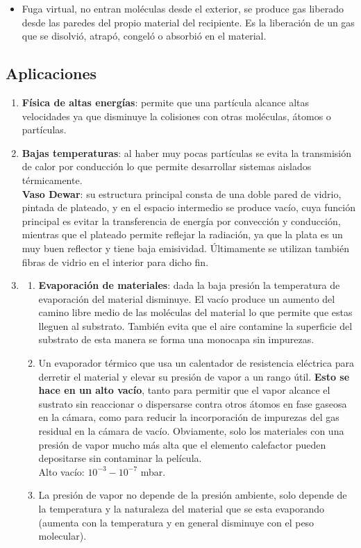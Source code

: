 \begin{enumerate}[resume]
\begin{itemize}
        \item Fuga virtual, no entran moléculas desde el exterior, se produce gas liberado desde las paredes del propio material del recipiente. Es la liberación de un gas que se disolvió, atrapó, congeló o absorbió en el material.
        
    \end{itemize}
\end{enumerate}

\subsection{Aplicaciones}
\begin{enumerate}[resume]
    \item %
    \textbf{Física de altas energías}: permite que una partícula alcance altas velocidades ya que disminuye la colisiones con otras moléculas, átomos o partículas.
    \item %
    \textbf{Bajas temperaturas}:  al haber muy pocas partículas se evita la transmisión de calor por conducción lo que permite desarrollar sistemas aislados térmicamente.
    \\ 
    \textbf{Vaso Dewar}: su estructura principal consta de una doble pared de vidrio, pintada de plateado, y en el espacio intermedio se produce vacío, cuya función principal es evitar la transferencia de energía por convección y conducción, mientras que el plateado permite reflejar la radiación, ya que la plata es un muy buen reflector y tiene baja emisividad. Últimamente se utilizan también fibras de vidrio en el interior para dicho fin.
    \item %
    \begin{enumerate}
        \item %
        \textbf{Evaporación de materiales}:  dada la baja presión la temperatura de evaporación del material disminuye. El vacío produce un aumento del camino libre medio de las moléculas del material lo que permite que estas lleguen al substrato. También evita que el aire contamine la superficie del substrato de esta manera se forma una monocapa sin impurezas. 
        \item %
        Un evaporador térmico que usa un calentador de resistencia eléctrica para derretir el material y elevar su presión de vapor a un rango útil. \textbf{Esto se hace en un alto vacío}, tanto para permitir que el vapor alcance el sustrato sin reaccionar o dispersarse contra otros átomos en fase gaseosa en la cámara, como para reducir la incorporación de impurezas del gas residual en la cámara de vacío. Obviamente, solo los materiales con una presión de vapor mucho más alta que el elemento calefactor pueden depositarse sin contaminar la película.
        \\ 
        Alto vacío: $\mathrm{10^{-3}}-\mathrm{10^{-7}}$ mbar.
        \item %
        La presión de vapor no depende de la presión ambiente, solo depende de la temperatura y la naturaleza del material que se esta evaporando (aumenta con la temperatura y en general disminuye con el peso molecular).
 

\end{enumerate}
\end{enumerate}
